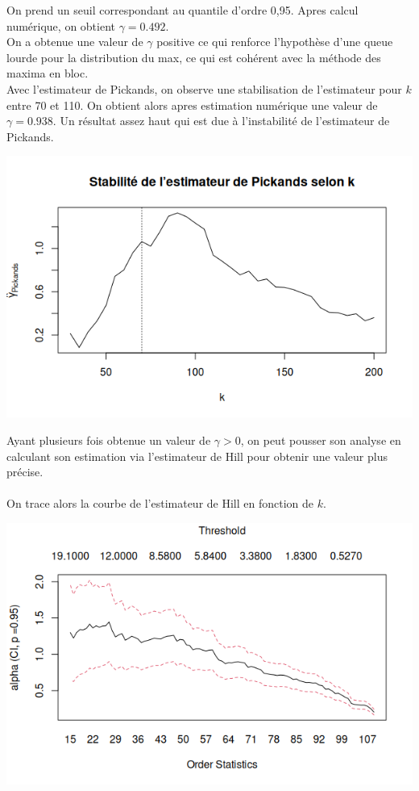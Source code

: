 \documentclass{article}
\theoremstyle{plain}
\theoremstyle{definition}
\theoremstyle{plain}
\begin{document}
\noindent On prend un seuil correspondant au quantile d’ordre 0,95. Apres calcul numérique, on obtient $\gamma = 0.492$.
\\
On a obtenue une valeur de $\gamma$ positive ce qui renforce l'hypothèse d'une queue lourde pour la distribution du max, ce qui est cohérent avec la méthode des maxima en bloc. 
\\
Avec l'estimateur de Pickands, on observe une stabilisation de l'estimateur pour $k$ entre 70 et 110. On obtient alors apres estimation numérique une valeur de $\gamma = 0.938$. Un résultat assez haut qui est due à l'instabilité de l'estimateur de Pickands. 

\begin{center}
	\includegraphics[scale=0.65]{./images/pickandsdansih.png} 
\end{center}




\noindent Ayant plusieurs fois obtenue un valeur de $\gamma > 0$, on peut pousser son analyse en calculant son estimation via l'estimateur de Hill pour obtenir une valeur plus précise.
\\
\\
On trace alors la courbe de l'estimateur de Hill en fonction de $k$.

\begin{center}
	\includegraphics[scale=0.65]{./images/danishsad.png} 
\end{center}
\end{document}
